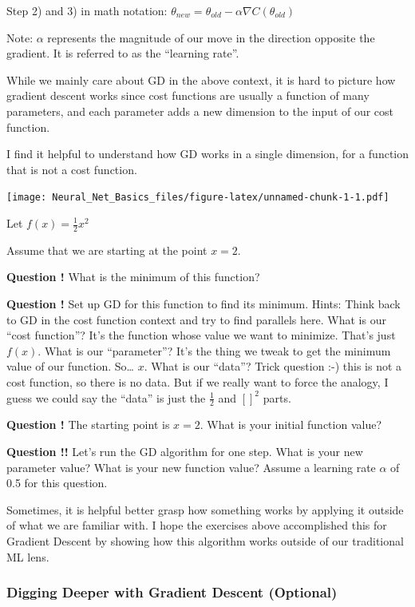 \documentclass[
]{article}
\begin{document}
Step 2) and 3) in math notation:
\(\theta_{new} = \theta_{old} - \alpha \nabla C(\theta_{old})\)

Note: \(\alpha\) represents the magnitude of our move in the direction
opposite the gradient. It is referred to as the ``learning rate''.

While we mainly care about GD in the above context, it is hard to
picture how gradient descent works since cost functions are usually a
function of many parameters, and each parameter adds a new dimension to
the input of our cost function.

I find it helpful to understand how GD works in a single dimension, for
a function that is not a cost function.

\texttt{[image: Neural\_Net\_Basics\_files/figure-latex/unnamed-chunk-1-1.pdf]}

Let \(f(x) = \frac{1}{2}x^2\)

Assume that we are starting at the point \(x = 2\).

\textbf{Question !} What is the minimum of this function?

\textbf{Question !} Set up GD for this function to find its minimum.
Hints: Think back to GD in the cost function context and try to find
parallels here. What is our ``cost function''? It's the function whose
value we want to minimize. That's just \(f(x)\). What is our
``parameter''? It's the thing we tweak to get the minimum value of our
function. So\ldots{} \(x\). What is our ``data''? Trick question :-)
this is not a cost function, so there is no data. But if we really want
to force the analogy, I guess we could say the ``data'' is just the
\(\frac{1}{2}\) and \([]^2\) parts.

\textbf{Question !} The starting point is \(x=2\). What is your initial
function value?

\textbf{Question !!} Let's run the GD algorithm for one step. What is
your new parameter value? What is your new function value? Assume a
learning rate \(\alpha\) of 0.5 for this question.

Sometimes, it is helpful better grasp how something works by applying it
outside of what we are familiar with. I hope the exercises above
accomplished this for Gradient Descent by showing how this algorithm
works outside of our traditional ML lens.

\hypertarget{digging-deeper-with-gradient-descent-optional}{%
\subsubsection{Digging Deeper with Gradient Descent
(Optional)}\label{digging-deeper-with-gradient-descent-optional}}
\end{document}
